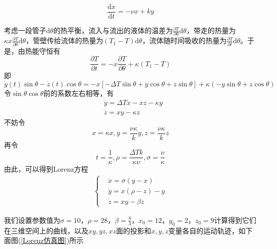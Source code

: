         \[
            \frac{\mathrm{d}x}{\mathrm{d}t} = - \nu x + k y
        \]
        \par
        考虑一段管子$\mathrm{d}\theta $的热平衡，流入与流出的液体的温差为$\frac{\partial T}{\partial \theta }\mathrm{d}\theta$，带走的热量为$\kappa x\frac{\partial T}{\partial \theta }\mathrm{d} \theta$，管壁传给流体的热量为$(T_1-T)\mathrm{d}\theta $，流体随时间吸收的热量为$\frac{\partial T}{\partial t}\mathrm{d}\theta$。于是，由热能守恒有
        \[
            \frac{\partial T}{\partial t} = -x\frac{\partial T}{\partial \theta } + \kappa (T_1-T)
        \]
        即
        \[
            \dot{y}(t)\sin \theta -\dot{z}(t) \cos \theta = -x [-\Delta T \sin \theta + y\cos \theta +z\sin \theta ] + \kappa(-y\sin \theta+z\cos \theta)
        \]
        令$\sin \theta\cos \theta$前的系数左右相等，有
        \begin{align*}
        &\dot{y} = \Delta T x - xz - \kappa y \\
        &\dot{z} = xy - \kappa z
        \end{align*}
        不妨令
        \[
            x = \kappa x,y=\frac{\nu \kappa}{k}y, z=\frac{\nu \kappa}{k}z
        \]
        再令
        \[
            t = \frac{1}{\kappa},\rho = \frac{\Delta T k}{\kappa \nu },\sigma = \frac{\nu }{\kappa}
        \]
        由此，可以得到Lorenz方程
        \begin{align*}
        	\left\{
        		\begin{aligned}
        		&\dot{x} = \sigma(y-x)\\
		        &\dot{y} = x(\rho -z) - y\\
		        &\dot{z} = xy - \beta z
        		\end{aligned}
        	\right.
        \end{align*}
        \par
        我们设置参数值为$\sigma = 10$，$\rho = 28$，$\beta = \frac{8}{3}$，$x_0=12$，$y_0=2$，$z_0=9$计算得到它们在三维空间上的曲线，以及$xy,yz,xz$面的投影和$x,y,z$变量各自的运动轨迹，如下面图(\ref{Lorenz仿真图})所示
